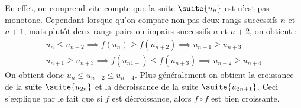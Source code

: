 \documentclass[a4paper,french,bookmarks]{article}
\begin{document}
\begin{minipage}{0.55\linewidth}
    
    En effet, on comprend vite compte que la suite $\suite{u_n}$ est n'est pas monotone. Cependant lorsque qu'on compare non pas deux rangs successifs $n$ et $n+1$, mais plutôt deux rangs pairs ou impairs successifs $n$ et $n+2$, on obtient :
    \[ \begin{array}{c}
         u_n \leq u_{n+2} \implies f\left(u_n\right) \geq f\left(u_{n+2}\right) \implies u_{n+1} \geq u_{n+3} \\
         u_{n+1} \geq u_{n+3} \implies f\left(u_{n1+}\right) \leq f\left(u_{n+3}\right) \implies u_{n+2} \geq u_{n+4}
    \end{array}\]
    On obtient donc $u_n \leq u_{n+2} \leq u_{n+4}$. Plus généralement on obtient la croissance de la suite $\suite{u_{2n}}$ et la décroissance de la suite $\suite{u_{2n+1}}$. Ceci s'explique par le fait que si $f$ est décroissance, alors $f \circ f$ est bien croissante.
\end{minipage}
%
\hfill
%
\end{document}
